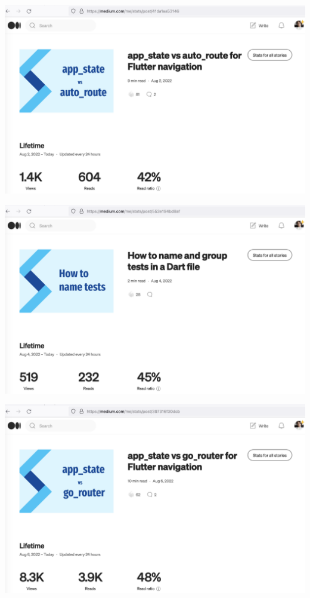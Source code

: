 \begin{center}
    \includegraphics[width=\textwidth]{2022-08-02_app_state}
\end{center}

\begin{center}
    \includegraphics[width=\textwidth]{2022-08-04_tests}
\end{center}

\begin{center}
    \includegraphics[width=\textwidth]{2022-08-06_app_state}
\end{center}

